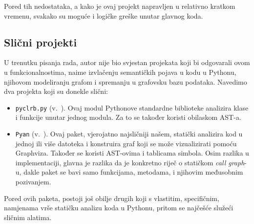 Pored tih nedostataka, a kako je ovaj projekt
napravljen u relativno kratkom vremenu,
svakako su moguće i logičke greške
unutar glavnog koda.

\subsection{Slični projekti} \label{subsec:slicni}

U trenutku pisanja rada, autor nije bio svjestan projekata
koji bi odgovarali ovom u funkcionalnostima, naime
izvlačenju semantičkih pojava u kodu u Pythonu, njihovom modeliranju
grafom i spremanju u grafovsku bazu podataka. Navedimo
dva projekta koji su donekle slični:

\begin{itemize}

\item \texttt{pyclrb.py} (v.\ \cite{docs:pyclbr}). Ovaj modul Pythonove
standardne biblioteke analizira klase i funkcije unutar jednog modula.
Za to se također koristi obilaskom AST-a.

\item \texttt{Pyan} (v.\ \cite{repo:pyan}). Ovaj paket, vjerojatno
najsličniji našem, statički analizira kod u jednoj ili više datoteka i
konstruira graf koji se može vizualizirati pomoću Graphviza. Također se
koristi AST-ovima i tablicama simbola. Osim razlika u implementaciji,
glavna je razlika da je konkretno riječ o statičkom \emph{call graph}-u,
dakle paket se bavi samo funkcijama, metodama, i njihovim međusobnim
pozivanjem.

\end{itemize}

Pored ovih paketa, postoji još obilje drugih koji s vlastitim, specifičnim,
namjenama vrše statičku analizu koda u Pythonu, pritom se
najčešće služeći sličnim alatima.



